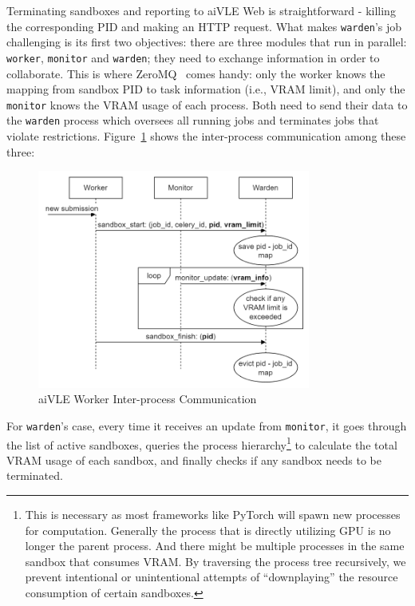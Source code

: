 Terminating sandboxes and reporting to aiVLE Web is straightforward - killing the corresponding PID and making an HTTP request. What makes \texttt{warden}'s job challenging is its first two objectives: there are three modules that run in parallel: \texttt{worker}, \texttt{monitor} and \texttt{warden}; they need to exchange information in order to collaborate. This is where ZeroMQ~\parencite{zeromq} comes handy: only the worker knows the mapping from sandbox PID to task information (i.e., VRAM limit), and only the \texttt{monitor} knows the VRAM usage of each process. Both need to send their data to the \texttt{warden} process which oversees all running jobs and terminates jobs that violate restrictions. Figure~\ref{fig:aivle-worker-ipc} shows the inter-process communication among these three:

\begin{figure}[H]
    \centering
    \includegraphics[width=0.8\textwidth]{images/aivle-worker-ipc.png}
    \caption{aiVLE Worker Inter-process Communication}
    \label{fig:aivle-worker-ipc}
\end{figure}

For \texttt{warden}'s case, every time it receives an update from \texttt{monitor}, it goes through the list of active sandboxes, queries the process hierarchy\footnote{This is necessary as most frameworks like PyTorch will spawn new processes for computation. Generally the process that is directly utilizing GPU is no longer the parent process. And there might be multiple processes in the same sandbox that consumes VRAM. By traversing the process tree recursively, we prevent intentional or unintentional attempts of ``downplaying'' the resource consumption of certain sandboxes.} to calculate the total VRAM usage of each sandbox, and finally checks if any sandbox needs to be terminated.

